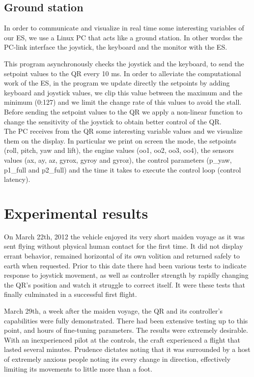 \documentclass[11pt]{article}
\begin{document}
\subsection{Ground station}
\label{sec:groundstation}

In order to communicate and visualize in real time some interesting
variables of our ES, we use a Linux PC that acts like a ground station.
In other wordss the PC-link interface the joystick, the keyboard and
the monitor with the ES.

This program asynchronously checks the joystick and the keyboard,
to send the setpoint
values to the QR every 10 ms. In order to alleviate the computational work of
the ES, in the program we update directly the setpoints by adding
keyboard and joystick values, we clip this value between the maximum
and the minimum (0:127) and we limit the change rate of this values
to avoid the stall.\\

Before sending the setpoint values to the QR we apply a non-linear
function to change the sensitivity of the joystick to obtain better
control of the QR.\\
The PC receives from the QR some interesting variable
values and we visualize them on the display. In particular we print
on screen the mode, the setpoints (roll, pitch, yaw and lift), the
engine values (oo1, oo2, oo3, oo4), the sensors values (ax, ay, az,
gyrox, gyroy and gyroz), the control parameters (p\_yaw, p1\_full
and p2\_full) and the time it takes to execute the control loop (control latency).


\section{Experimental results}
\label{sec:experimental}
On March 22th, 2012 the vehicle enjoyed its very short maiden voyage as it was sent flying without physical human contact for the first time. It did not display errant behavior, remained horizontal of its own volition and returned safely to earth when requested. Prior to this date there had been various tests to indicate response to joystick movement, as well as controller strength by rapidly changing the QR's position and watch it struggle to correct itself. It were these tests that finally culminated in a successful first flight.

March 29th, a week after the maiden voyage, the QR and its controller's capabilities were fully demonstrated. There had been extensive testing up to this point, and hours of fine-tuning parameters. The results were extremely desirable. With an inexperienced pilot at the controls, the craft experienced a flight that lasted several minutes. Prudence dictates noting that it was surrounded by a host of extremely anxious people noting its every change in direction, effectively limiting its movements to little more than a foot.
\end{document}
